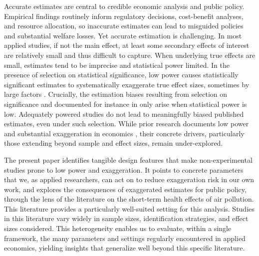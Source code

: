 \documentclass[12pt]{article}
\begin{document}
\onehalfspacing




	
		Accurate estimates are central to credible economic analysis and public policy. Empirical findings routinely inform regulatory decisions, cost-benefit analyses, and resource allocation, so inaccurate estimates can lead to misguided policies and substantial welfare losses. Yet accurate estimation is challenging. In most applied studies, if not the main effect, at least some secondary effects of interest are relatively small and thus difficult to capture. When underlying true effects are small, estimates tend to be imprecise and statistical power limited. In the presence of selection on statistical significance, low power causes statistically significant estimates to systematically exaggerate true effect sizes, sometimes by large factors \citep{gelman_type_2000, ioannidis_why_2008, gelman_beyond_2014}. Crucially, the estimation biases resulting from selection on significance and documented for instance in \cite{andrews_identification_2019} only arise when statistical power is low. Adequately powered studies do not lead to meaningfully biased published estimates, even under such selection. While prior research documents low power and substantial exaggeration in economics \citep{ioannidis_power_2017, ferraro_feature_2020, young_consistency_2022}, their concrete drivers, particularly those extending beyond sample and effect sizes, remain under-explored.  
		
		The present paper identifies tangible design features that make non-experimental studies prone to low power and exaggeration. It points to concrete parameters that we, as applied researchers, can act on to reduce exaggeration risk in our own work, and explores the consequences of exaggerated estimates for public policy, through the lens of the literature on the short-term health effects of air pollution. This literature provides a particularly well-suited setting for this analysis. Studies in this literature vary widely in sample sizes, identification strategies, and effect sizes considered. This heterogeneity enables us to evaluate, within a single framework, the many parameters and settings regularly encountered in applied economics, yielding insights that generalize well beyond this specific literature. 
		
\end{document}

